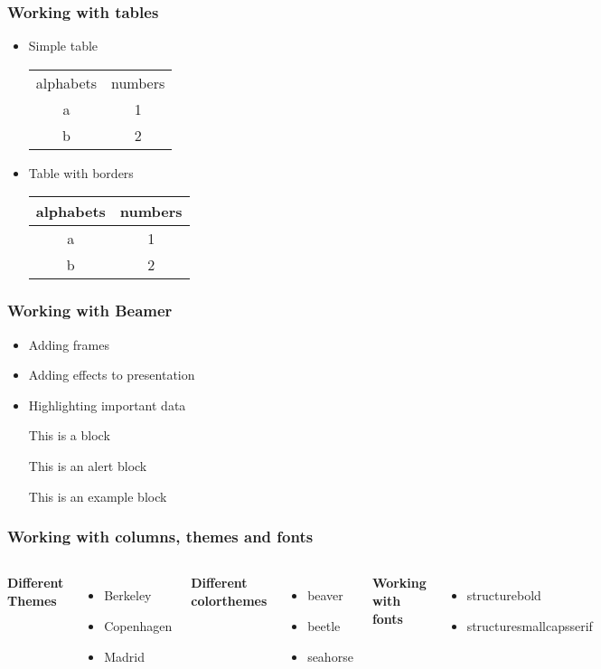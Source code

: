 \documentclass{beamer}
\begin{document}
\begin{frame}
\frametitle{Working with tables}
\begin{itemize}
\item Simple table
\begin{center}
\begin{tabular}{c c}
alphabets & numbers\\
a & 1\\
b & 2\\
\end{tabular}
\end{center}
\item Table with borders
\begin{center}
\begin{tabular}{|c| c|}
\hline
alphabets & numbers\\
\hline
a & 1\\
b & 2\\
\hline
\end{tabular}
\end{center}
\end{itemize}
\end{frame}
\begin{frame}
\frametitle{Working with Beamer}
\begin{itemize}
\item<1-> Adding frames
\item<2-> Adding effects to presentation
\item<3-> \alert{Highlighting important data}
\\<4->
\begin{block}{This is a block}
\end{block}
\begin{alertblock}{This is an alert block}
\end{alertblock}
\begin{examples}{This is an example block}
\end{examples}
\end{itemize}
\end{frame}
\begin{frame}
\frametitle{Working with columns, themes and fonts}
\begin{columns}
\textbf{Different Themes}
\begin{itemize}
\item Berkeley
\item Copenhagen
\item Madrid
\end{itemize}
\textbf{Different colorthemes}
\begin{itemize}
\item beaver
\item beetle
\item seahorse
\end{itemize}
\textbf{Working with fonts}
\begin{itemize}
\item structurebold
\item structuresmallcapsserif
\end{itemize}
\end{columns}
\end{frame}
\end{document}

